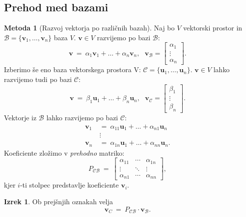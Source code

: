 \documentclass[11pt]{article}
\renewcommand{\u}{\mathbf{u}}
\newcommand{\vv}{\mathbf{v}}
\newcommand{\0}{\mathbf{0}}
\newcommand{\B}{\mathscr{B}}
\newcommand{\C}{\mathscr{C}}
\theoremstyle{definition}
\theoremstyle{definition}
\theoremstyle{definition}
\newtheorem{izrek}{Izrek}[section]
\theoremstyle{definition}
\newtheorem{metoda}{Metoda}[section]
\begin{document}

\subsection{Prehod med bazami}
\vspace{0.5cm}

\begin{metoda}[Razvoj vektorja po različnih bazah]

Naj bo $V$ vektorski prostor in $\B = \{\vv_1,\ldots,\vv_n\}$ baza $V$. $\vv \in V$ razvijemo po bazi $\B$:
$$\vv ~=~ \alpha_1 \vv_1 + \ldots + \alpha_n \vv_n, ~~~\vv_\B = \begin{bmatrix}
\alpha_1 \\
\vdots \\
\alpha_n
\end{bmatrix}.$$
Izberimo še eno baza vektorskega prostora V: $\C = \{\u_1,\ldots,\u_n\}$. $\vv \in V$ lahko razvijemo tudi po bazi $\C$:
$$\vv ~=~ \beta_1 \u_1 + \ldots + \beta_n \u_n, ~~~\vv_\C = \begin{bmatrix}
\beta_1 \\
\vdots \\
\beta_n
\end{bmatrix}.$$
Vektorje iz $\B$ lahko razvijemo po bazi $\C$:
\begin{align*}
\vv_1 ~&=~ \alpha_{11} \u_1 + \ldots + \alpha_{n1} \u_n \\
&\vdots \\
\vv_n ~&=~ \alpha_{1n} \u_1 + \ldots + \alpha_{nn} \u_n.
\end{align*}
Koeficiente zložimo v \textit{prehodno} matriko:
$$P_{\C\B} ~=~ \begin{bmatrix}
\alpha_{11} & \cdots & \alpha_{1n} \\
\vdots & \ddots & \vdots \\
\alpha_{n1} & \cdots & \alpha_{nn}
\end{bmatrix},$$
kjer $i$-ti stolpec predstavlje koeficiente $\vv_i$.

\end{metoda}
\vspace{0.5cm}

\begin{izrek}

Ob prejšnjih oznakah velja
$$\vv_C ~=~ P_{\C\B} \cdot \vv_\B.$$

\end{izrek}
\vspace{0.5cm}
\end{document}
